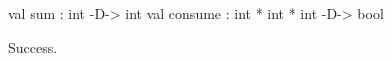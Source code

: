 \chklistingtrue
{}
\begin{ChkListingMsg}
val sum : int -D-> int 
val consume : int * int * int -D-> bool 
\end{ChkListingMsg}
\begin{ChkListingErr}
Success.
\end{ChkListingErr}
